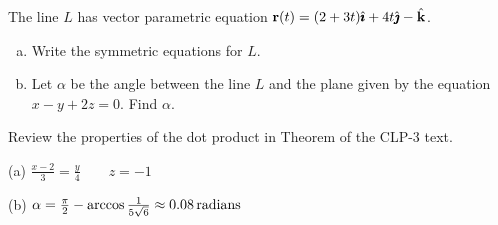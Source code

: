 \begin{question}[M200 2013D] %
The line $L$ has vector parametric equation 
$\mathbf{r}(t) = (2 + 3t)\hat{\pmb{\imath}} + 4t\hat{\pmb{\jmath}} - \hat{\mathbf{k}}$.
\begin{enumerate}[(a)]
\item
Write the symmetric equations for $L$.
\item
Let $\alpha$ be the angle between the line $L$ and the plane given 
by the equation $x - y + 2z = 0$. Find $\alpha$.
\end{enumerate}
\end{question}

\begin{hint}
Review the properties of the dot product in 
Theorem  of the CLP-3 text.
\end{hint}

\begin{answer}
(a)  $\frac{x-2}{3}=\frac{y}{4}\qquad z=-1$

(b)  $\alpha =\frac{\pi}{2}-\arccos\frac{1}{5\sqrt{6}}
             \approx 0.08\,\text{radians}$
\end{answer}

